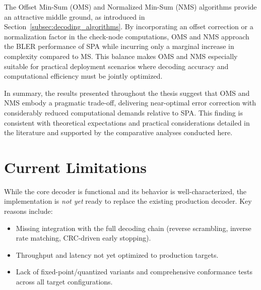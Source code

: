 \documentclass[../main.tex]{subfiles}
\begin{document}
The Offset Min-Sum (OMS) and Normalized Min-Sum (NMS) algorithms provide an attractive middle ground, as introduced in Section~\ref{subsec:decoding_algorithms}. By incorporating an offset correction or a normalization factor in the check-node computations, OMS and NMS approach the BLER performance of SPA while incurring only a marginal increase in complexity compared to MS. This balance makes OMS and NMS especially suitable for practical deployment scenarios where decoding accuracy and computational efficiency must be jointly optimized.

In summary, the results presented throughout the thesis suggest that OMS and NMS embody a pragmatic trade-off, delivering near-optimal error correction with considerably reduced computational demands relative to SPA. This finding is consistent with theoretical expectations and practical considerations detailed in the literature and supported by the comparative analyses conducted here.


\section*{Current Limitations}
While the core decoder is functional and its behavior is well-characterized, the implementation is \emph{not yet} ready to replace the existing production decoder. Key reasons include:
\begin{itemize}
  \item Missing integration with the full decoding chain (reverse scrambling, inverse rate matching, CRC-driven early stopping).
  \item Throughput and latency not yet optimized to production targets.
  \item Lack of fixed-point/quantized variants and comprehensive conformance tests across all target configurations.
\end{itemize}
\end{document}
